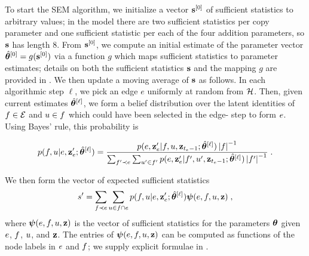 \documentclass[aps,pre,reprint,superscriptaddress,nofootinbib]{revtex4-2}
\begin{document}
    To start the SEM algorithm, we initialize a vector $\mathbf{s}^{[0]}$ of sufficient statistics to arbitrary values; in the \model{} model there are two sufficient statistics per copy parameter and one sufficient statistic per each of the four addition parameters, so $\mathbf{s}$ has length $8$.
    From $\mathbf{s}^{[0]}$, we compute an initial estimate of the parameter vector $\hat{\boldsymbol{\theta}}^{[0]} = g(\mathbf{s}^{[0]})$ via a function $g$ which maps sufficient statistics to parameter estimates; details on both the sufficient statistics $\mathbf{s}$ and the mapping $g$ are provided in .
    We then update a moving average of $\mathbf{s}$ as follows. 
    In each algorithmic step $\ell$, we pick an edge $e$ uniformly at random from $\mathcal{H}$. 
    Then, given current estimates $\hat{\boldsymbol{\theta}}^{[\ell]}$, we form a belief distribution over the latent identities of $f \in \mathcal{E}$ and $u \in f$ which could have been selected in the edge-
    step to form $e$. 
    Using Bayes' rule, this probability is 
    \begin{widetext}
    \begin{align}
        p(f,u | e, \mathbf{z}'_e; \hat{\boldsymbol{\theta}}^{[\ell]}) = \frac{p(e, \mathbf{z}'_e | f, u, \mathbf{z}_{t_e-1}; \hat{\boldsymbol{\theta}}^{[\ell]}) \left| f \right|^{-1}}{\sum_{f' \prec e} \sum_{u' \in f'} p(e, \mathbf{z}'_e | f', u', \mathbf{z}_{t_e-1}; \hat{\boldsymbol{\theta}}^{[\ell]}) \left| f' \right|^{-1} } \;. \label{eq:bayes}
    \end{align}
    \end{widetext}
    We then form the vector of expected sufficient statistics 
    \begin{align}
        s' = \sum_{f \prec e} \sum_{u \in f\cap e} p(f, u | e, \mathbf{z}'_e; \hat{\boldsymbol{\theta}}^{[\ell]}) \boldsymbol{\psi}(e, f, u, \mathbf{z}) \;, \label{eq:sufficient-stats-update}
    \end{align}
    where $\boldsymbol{\psi}(e, f, u, \mathbf{z})$ is the vector of sufficient statistics for the parameters $\boldsymbol{\theta}$ given $e$, $f$, $u$, and $\mathbf{z}$.
    The entries of $\boldsymbol{\psi}(e, f, u, \mathbf{z})$ can be computed as functions of the node labels in $e$ and $f$; we supply explicit formulae in . 
\end{document}
